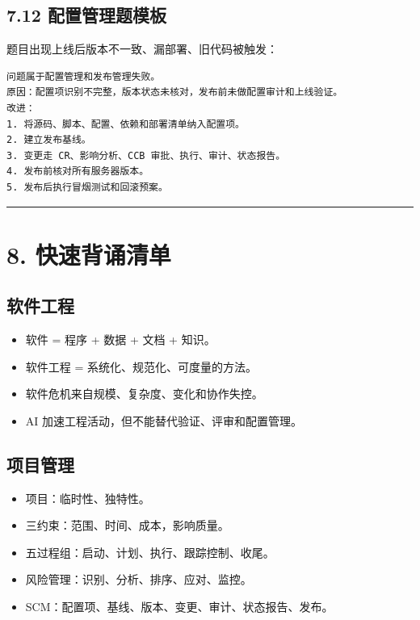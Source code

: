 \documentclass[UTF8,zihao=-4]{ctexart}
\begin{document}
\subsection{7.12 配置管理题模板}

题目出现上线后版本不一致、漏部署、旧代码被触发：

\small
\begin{verbatim}
问题属于配置管理和发布管理失败。
原因：配置项识别不完整，版本状态未核对，发布前未做配置审计和上线验证。
改进：
1. 将源码、脚本、配置、依赖和部署清单纳入配置项。
2. 建立发布基线。
3. 变更走 CR、影响分析、CCB 审批、执行、审计、状态报告。
4. 发布前核对所有服务器版本。
5. 发布后执行冒烟测试和回滚预案。
\end{verbatim}
\normalsize

\bigskip\hrule\bigskip

\section{8. 快速背诵清单}

\subsection{软件工程}

\begin{itemize}
\item 软件 = 程序 + 数据 + 文档 + 知识。
\item 软件工程 = 系统化、规范化、可度量的方法。
\item 软件危机来自规模、复杂度、变化和协作失控。
\item AI 加速工程活动，但不能替代验证、评审和配置管理。
\end{itemize}

\subsection{项目管理}

\begin{itemize}
\item 项目：临时性、独特性。
\item 三约束：范围、时间、成本，影响质量。
\item 五过程组：启动、计划、执行、跟踪控制、收尾。
\item 风险管理：识别、分析、排序、应对、监控。
\item SCM：配置项、基线、版本、变更、审计、状态报告、发布。
\end{itemize}
\end{document}
